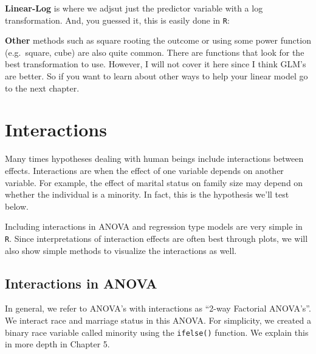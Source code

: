 \documentclass[]{tufte-book}
\newenvironment{Shaded}{}{}
\newcommand{\KeywordTok}[1]{\textcolor[rgb]{0.00,0.44,0.13}{\textbf{#1}}}
\newcommand{\DataTypeTok}[1]{\textcolor[rgb]{0.56,0.13,0.00}{#1}}
\newcommand{\StringTok}[1]{\textcolor[rgb]{0.25,0.44,0.63}{#1}}
\newcommand{\OperatorTok}[1]{\textcolor[rgb]{0.40,0.40,0.40}{#1}}
\newcommand{\NormalTok}[1]{#1}
\theoremstyle{definition}
\theoremstyle{definition}
\theoremstyle{remark}
\begin{document}
\textbf{Linear-Log} is where we adjsut just the predictor variable with
a log transformation. And, you guessed it, this is easily done in
\texttt{R}:

\begin{Shaded}
\end{Shaded}

\textbf{Other} methods such as square rooting the outcome or using some
power function (e.g.~square, cube) are also quite common. There are
functions that look for the best transformation to use. However, I will
not cover it here since I think GLM's are better. So if you want to
learn about other ways to help your linear model go to the next chapter.

\section*{Interactions}\label{interactions}

Many times hypotheses dealing with human beings include interactions
between effects. Interactions are when the effect of one variable
depends on another variable. For example, the effect of marital status
on family size may depend on whether the individual is a minority. In
fact, this is the hypothesis we'll test below.

Including interactions in ANOVA and regression type models are very
simple in \texttt{R}. Since interpretations of interaction effects are
often best through plots, we will also show simple methods to visualize
the interactions as well.

\subsection*{Interactions in ANOVA}\label{interactions-in-anova}

In general, we refer to ANOVA's with interactions as ``2-way Factorial
ANOVA's''. We interact race and marriage status in this ANOVA. For
simplicity, we created a binary race variable called minority using the
\texttt{ifelse()} function. We explain this in more depth in Chapter 5.
\end{document}
